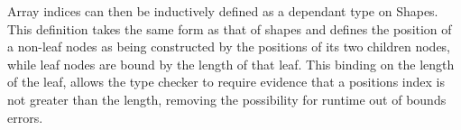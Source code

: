 \begin{AgdaAlign}
\begin{code}[hide]%
%
\>[2]\<%
\\
\>[2][@{}l@{\AgdaIndent{0}}]%
\>[4]\<%
\\
\>[4][@{}l@{\AgdaIndent{0}}]%
\>[6]\AgdaSpace{}%
\AgdaSpace{}%
\AgdaSymbol{:}\AgdaSpace{}%
\<%
\\
%
\>[2]\AgdaSpace{}%
\AgdaSymbol{:}\AgdaSpace{}%
\AgdaSpace{}%
\AgdaSpace{}%
\AgdaSpace{}%
\AgdaSpace{}%
\AgdaSpace{}%
\AgdaSpace{}%
\AgdaSpace{}%
\AgdaSpace{}%
\<%
\\
%
\>[2]\AgdaSpace{}%
\AgdaSpace{}%
\AgdaSpace{}%
\AgdaSpace{}%
\AgdaSpace{}%
\AgdaSymbol{=}\AgdaSpace{}%
\<%
\end{code}
\begin{code}%
\>[2][@{}l@{\AgdaIndent{1}}]%
\>[4]\AgdaSpace{}%
\AgdaSymbol{=}\AgdaSpace{}%
\AgdaSymbol{(}%
\>[12]%
\>[15]%
\>[18]\AgdaSymbol{)}\AgdaSpace{}%
\AgdaSpace{}%
\AgdaSymbol{(}\AgdaSpace{}%
\AgdaSpace{}%
\AgdaSymbol{)}\<%
\\
%
\>[4]\AgdaSpace{}%
\AgdaSymbol{=}%
\>[12]%
\>[15]\AgdaSpace{}%
\AgdaSymbol{(}%
\>[21]\AgdaSpace{}%
\AgdaSymbol{(}\AgdaSpace{}%
\AgdaSpace{}%
\AgdaSymbol{))}\<%
\end{code}
\begin{code}[hide]%
%
\>[4]\AgdaSpace{}%
\AgdaSpace{}%
\<%
\end{code}

Array indices can then be inductively defined as a dependant type on Shapes.
This definition takes the same form as that of shapes and defines the position 
of a non-leaf nodes as being constructed by the positions of its two children 
nodes, while leaf nodes are bound by the length of that leaf.
This binding on the length of the leaf, allows the type checker to require
evidence that a positions index is not greater than the length, removing the possibility
for runtime out of bounds errors.



\end{AgdaAlign}
